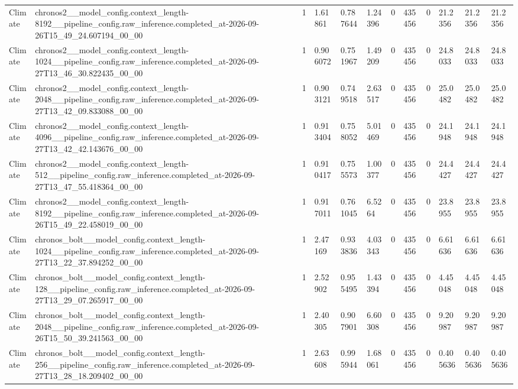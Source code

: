 \begin{tabular}{llllllllllll}
Climate & chronos2\_\_model\_config.context\_length-8192\_\_pipeline\_config.raw\_inference.completed\_at-2026-09-26T15\_49\_24.607194\_00\_00 & 1 & 1.61861 & 0.787644 & 1.24396 & 0 & 435456 & 0 & 21.2356 & 21.2356 & 21.2356 \\
Climate & chronos2\_\_model\_config.context\_length-1024\_\_pipeline\_config.raw\_inference.completed\_at-2026-09-27T13\_46\_30.822435\_00\_00 & 1 & 0.906072 & 0.751967 & 1.49209 & 0 & 435456 & 0 & 24.8033 & 24.8033 & 24.8033 \\
Climate & chronos2\_\_model\_config.context\_length-2048\_\_pipeline\_config.raw\_inference.completed\_at-2026-09-27T13\_42\_09.833088\_00\_00 & 1 & 0.903121 & 0.749518 & 2.63517 & 0 & 435456 & 0 & 25.0482 & 25.0482 & 25.0482 \\
Climate & chronos2\_\_model\_config.context\_length-4096\_\_pipeline\_config.raw\_inference.completed\_at-2026-09-27T13\_42\_42.143676\_00\_00 & 1 & 0.913404 & 0.758052 & 5.01469 & 0 & 435456 & 0 & 24.1948 & 24.1948 & 24.1948 \\
Climate & chronos2\_\_model\_config.context\_length-512\_\_pipeline\_config.raw\_inference.completed\_at-2026-09-27T13\_47\_55.418364\_00\_00 & 1 & 0.910417 & 0.755573 & 1.00377 & 0 & 435456 & 0 & 24.4427 & 24.4427 & 24.4427 \\
Climate & chronos2\_\_model\_config.context\_length-8192\_\_pipeline\_config.raw\_inference.completed\_at-2026-09-26T15\_49\_22.458019\_00\_00 & 1 & 0.917011 & 0.761045 & 6.5264 & 0 & 435456 & 0 & 23.8955 & 23.8955 & 23.8955 \\
Climate & chronos\_bolt\_\_model\_config.context\_length-1024\_\_pipeline\_config.raw\_inference.completed\_at-2026-09-27T13\_22\_37.894252\_00\_00 & 1 & 2.47169 & 0.933836 & 4.03343 & 0 & 435456 & 0 & 6.61636 & 6.61636 & 6.61636 \\
Climate & chronos\_bolt\_\_model\_config.context\_length-128\_\_pipeline\_config.raw\_inference.completed\_at-2026-09-27T13\_29\_07.265917\_00\_00 & 1 & 2.52902 & 0.955495 & 1.43394 & 0 & 435456 & 0 & 4.45048 & 4.45048 & 4.45048 \\
Climate & chronos\_bolt\_\_model\_config.context\_length-2048\_\_pipeline\_config.raw\_inference.completed\_at-2026-09-26T15\_50\_39.241563\_00\_00 & 1 & 2.40305 & 0.907901 & 6.60308 & 0 & 435456 & 0 & 9.20987 & 9.20987 & 9.20987 \\
Climate & chronos\_bolt\_\_model\_config.context\_length-256\_\_pipeline\_config.raw\_inference.completed\_at-2026-09-27T13\_28\_18.209402\_00\_00 & 1 & 2.63608 & 0.995944 & 1.68061 & 0 & 435456 & 0 & 0.405636 & 0.405636 & 0.405636 \\

\end{tabular}
